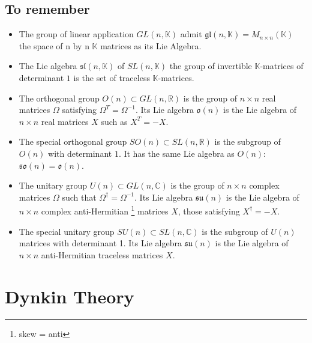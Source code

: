 \documentclass[11pt,a4paper]{article}
\theoremstyle{definition}
\numberwithin{equation}{section}
\begin{document}
\subsection{To remember}
\begin{itemize}
    \item The group of linear application $GL(n,\mathbb{K})$ admit $\mathfrak{gl}(n, \mathbb{K}) = M_{n\times n}(\mathbb{K})$ the space of n by n $\mathbb{K}$ matrices as its Lie Algebra.
    \item The Lie algebra $\mathfrak{sl}(n,\mathbb{K})$ of $SL(n,\mathbb{K})$ the group of invertible  $\mathbb{K}$-matrices of determinant $1$ is the set of traceless $\mathbb{K}$-matrices.
    \item The orthogonal group $O(n) \subset  GL(n, \mathbb{R})$ is the group of $n \times n$ real matrices $\Omega$ satisfying $\Omega^T = \Omega^{-1}$. Its Lie algebra $\mathfrak{o}(n)$ is the Lie algebra of $n \times n$ real matrices $X$ such as $X^T = -X$.
    \item The special orthogonal group $SO(n) \subset SL(n,\mathbb{R})$ is the subgroup of $O(n)$ with determinant $1$. It has the same Lie algebra as $O(n)$: $\mathfrak{so}(n) = \mathfrak{o}(n)$.
    \item The unitary group  $U(n)\subset GL(n,\mathbb{C})$ is the group of $n \times n$ complex matrices $\Omega$ such that $\Omega^\dagger = \Omega^{-1}$. Its Lie algebra $\mathfrak{su}(n)$ is the Lie algebra of $n \times n$ complex anti-Hermitian \footnote{skew = anti} matrices $X$, those satisfying $X^\dagger = -X$.
    \item The special unitary group $SU(n)\subset SL(n,\mathbb{C})$ is the subgroup of $U(n)$ matrices with determinant 1. Its Lie algebra $\mathfrak{su}(n)$ is the Lie algebra of $n \times n$ anti-Hermitian  traceless matrices $X$.
\end{itemize}
\section{Dynkin Theory}
\end{document}
